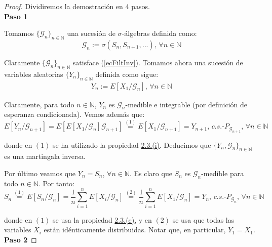 \begin{proof}
Dividiremos la demostración en 4 pasos.\\

\textbf{Paso 1}

Tomamos $\{\mathscr{G}_n\}_{n\in\mathds{N}}$ una sucesión de $\sigma$-álgebras definida como:
$$\mathscr{G}_n:=\sigma(S_n,S_{n+1},...)\text{, }\forall n\in\mathds{N}$$

Claramente $\{\mathscr{G}_n\}_{n\in\mathds{N}}$ satisface (\ref{ecFiltInv}). Tomamos ahora una sucesión de variables aleatorias $\{Y_n\}_{n\in\mathds{N}}$ definida como sigue:
\begin{gather}\tag{$*_2$}\label{aux2}
Y_n := E[X_1/\mathscr{G}_n]\text{, }\forall n\in \mathds{N}
\end{gather}

Claramente, para todo $n\in\mathds{N}$, $Y_n$ es $\mathscr{G}_n$-medible e integrable (por definición de esperanza condicionada). Vemos además que:
$$E[Y_n/\mathscr{G}_{n+1}] = E[E[X_1/\mathscr{G}_n]\mathscr{G}_{n+1}] \overset{(1)}{=} E[X_1/\mathscr{G}_{n+1}] = Y_{n+1} \text{, }c.s.\text{-}P_{\mathscr{G}_{n+1}}\text{, }\forall n\in \mathds{N}$$

donde en $(1)$ se ha utilizado la propiedad \hyperref[PropS4]{2.3.(i)}. Deducimos que $\{Y_n, \mathscr{G}_n\}_{n\in\mathds{N}}$ es una martingala inversa.

Por último veamos que $Y_n = S_n$, $\forall n\in\mathds{N}$. Es claro que $S_n$ es $\mathscr{G}_n$-medible para todo $n\in \mathds{N}$. Por tanto:
$$S_n \overset{(1)}{=} E[S_n/\mathscr{G}_n] = \frac{1}{n}\sum_{i=1}^nE[X_i/\mathscr{G}_n] \overset{(2)}{=} \frac{1}{n}\sum_{i=1}^nE[X_1/\mathscr{G}_n] = Y_n \text{, }c.s.\text{-}P_{\mathscr{G}_{n}}\text{, }\forall n\in \mathds{N}$$

donde en $(1)$ se usa la propiedad \hyperref[PropS1]{2.3.(e)}, y en $(2)$ se usa que todas las variables $X_i$ están idénticamente distribuidas. Notar que, en particular, $Y_1=X_1$.\\

\textbf{Paso 2}


\end{proof}
